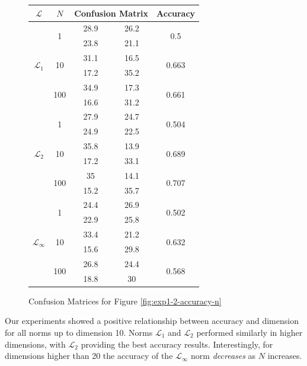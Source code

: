 \documentclass{article}
\begin{document}
\begin{figure}[H]
\centering
\begin{tabular}{|c|c|c|c|c|}
\hline
$\mathcal{L}$&$N$&\multicolumn{2}{|c|}{Confusion Matrix}&Accuracy\\
\hline
\multirow{6}{*}{$\mathcal{L}_1$}&\multirow{2}{*}{1}&28.9&26.2&\multirow{2}{*}{0.5}\\
\cline{3-4}
&&23.8&21.1&\\
\cline{2-5}
&\multirow{2}{*}{10}&31.1&16.5&\multirow{2}{*}{0.663}\\
\cline{3-4}
&&17.2&35.2&\\
\cline{2-5}
&\multirow{2}{*}{100}&34.9&17.3&\multirow{2}{*}{0.661}\\
\cline{3-4}
&&16.6&31.2&\\
\hline
\multirow{6}{*}{$\mathcal{L}_2$}&\multirow{2}{*}{1}&27.9&24.7&\multirow{2}{*}{0.504}\\
\cline{3-4}
&&24.9&22.5&\\
\cline{2-5}
&\multirow{2}{*}{10}&35.8&13.9&\multirow{2}{*}{0.689}\\
\cline{3-4}
&&17.2&33.1&\\
\cline{2-5}
&\multirow{2}{*}{100}&35&14.1&\multirow{2}{*}{0.707}\\
\cline{3-4}
&&15.2&35.7&\\
\hline
\multirow{6}{*}{$\mathcal{L}_{\infty}$}&\multirow{2}{*}{1}&24.4&26.9&\multirow{2}{*}{0.502}\\
\cline{3-4}
&&22.9&25.8&\\
\cline{2-5}
&\multirow{2}{*}{10}&33.4&21.2&\multirow{2}{*}{0.632}\\
\cline{3-4}
&&15.6&29.8&\\
\cline{2-5}
&\multirow{2}{*}{100}&26.8&24.4&\multirow{2}{*}{0.568}\\
\cline{3-4}
&&18.8&30&\\
\hline
\end{tabular}
\caption{Confusion Matrices for Figure \ref{fig:exp1-2-accuracy-n}}\label{fig:cm-exp1-2-accuracy-n}
\end{figure}
Our experiments showed a positive relationship between accuracy and dimension for all norms up to dimension 10. Norms $\mathcal{L}_1$ and $\mathcal{L}_2$ performed similarly in higher dimensions, with $\mathcal{L}_2$ providing the best accuracy results. Interestingly, for dimensions higher than 20 the accuracy of the $\mathcal{L}_{\infty}$ norm \emph{decreases} as $N$ increases.
\end{document}
